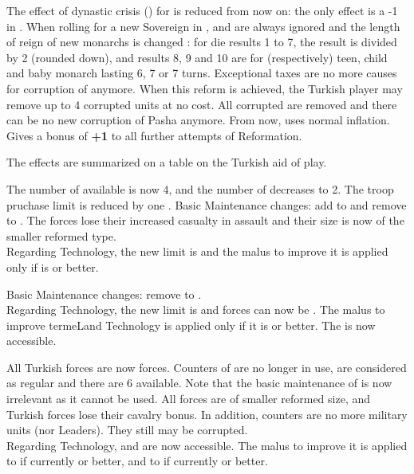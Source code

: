 The effect of dynastic crisis () for
\TUR is reduced from now on: the only effect is a -1 in \STAB.  When
rolling for a new Sovereign in , \DC and
 are always ignored and the length of reign of new
monarchs is changed : for die results 1 to 7, the result is divided by 2
(rounded down), and results 8, 9 and 10 are for (respectively) teen,
child and baby monarch lasting 6, 7 or 7 turns.
Exceptional taxes are no more causes for corruption of \Pasha
anymore. When this reform is achieved, the Turkish player may remove up
to 4 corrupted \Pasha units at no cost.
All corrupted \Pashas are removed and there can be no new corruption of
Pasha anymore. From now, \TUR uses normal inflation. Gives a bonus 
of {\bf +1} to all further attempts of Reformation.

 The effects are summarized on a table on the
Turkish aid of play.

The number of \Janissaire \ARMY available is now 4, and the number of
\Timar \ARMY decreases to 2. The troop pruchase limit is reduced by one \LD.
Basic Maintenance changes: add \ARMY\facemoins to \Janissaire and
remove \ARMY\faceplus to \Timar.
The \Janissaire forces lose their increased casualty
in assault and their size is now of the smaller reformed type.
\\
Regarding Technology, the new limit is \TBAR and the malus to improve
it is applied only if  is \TMUS or better.

Basic Maintenance changes: remove \ARMY\faceplus to \Timar.
\\
Regarding Technology, the new limit is \TMUS and \Timar forces can now
be \TMUS.  The malus to improve terme{Land Technology} is applied only
if it is \TMUS or better.  The  \TBAT is now
accessible.

All Turkish forces are now \Janissaire forces.  Counters of \Timar \ARMY
are no longer in use, \Timar \LD are considered as regular \Janissaire
and there are 6 \Janissaire\ARMY available.  Note that the basic
maintenance of \Timar is now irrelevant as it cannot be used.  All
forces are of smaller reformed size, and Turkish forces lose their
cavalry bonus.  In addition, \Pasha counters are no more military units
(nor Leaders). They still may be corrupted.
\\
Regarding Technology, \TMAN and \TTD are now accessible.  The malus to
improve it is applied to  if currently \TBAR or
better, and to  if currently \TBAT or better.

